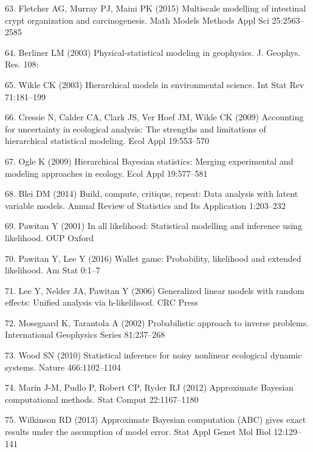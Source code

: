 \documentclass[10pt,letterpaper]{article}
\begin{document}
\hypertarget{ref-Fletcher2015-yc}{}
63. Fletcher AG, Murray PJ, Maini PK (2015) Multiscale modelling of
intestinal crypt organization and carcinogenesis. Math Models Methods
Appl Sci 25:2563--2585

\hypertarget{ref-Berliner2003-yl}{}
64. Berliner LM (2003) Physical-statistical modeling in geophysics. J.
Geophys. Res. 108:

\hypertarget{ref-Wikle2003-je}{}
65. Wikle CK (2003) Hierarchical models in environmental science. Int
Stat Rev 71:181--199

\hypertarget{ref-Cressie2009-wy}{}
66. Cressie N, Calder CA, Clark JS, Ver Hoef JM, Wikle CK (2009)
Accounting for uncertainty in ecological analysis: The strengths and
limitations of hierarchical statistical modeling. Ecol Appl 19:553--570

\hypertarget{ref-Ogle2009-cb}{}
67. Ogle K (2009) Hierarchical Bayesian statistics: Merging experimental
and modeling approaches in ecology. Ecol Appl 19:577--581

\hypertarget{ref-Blei2014-dh}{}
68. Blei DM (2014) Build, compute, critique, repeat: Data analysis with
latent variable models. Annual Review of Statistics and Its Application
1:203--232

\hypertarget{ref-Pawitan2001-xm}{}
69. Pawitan Y (2001) In all likelihood: Statistical modelling and
inference using likelihood. OUP Oxford

\hypertarget{ref-Pawitan2016-cz}{}
70. Pawitan Y, Lee Y (2016) Wallet game: Probability, likelihood and
extended likelihood. Am Stat 0:1--7

\hypertarget{ref-Lee2006-mr}{}
71. Lee Y, Nelder JA, Pawitan Y (2006) Generalized linear models with
random effects: Unified analysis via h-likelihood. CRC Press

\hypertarget{ref-Mosegaard2002-lx}{}
72. Mosegaard K, Tarantola A (2002) Probabilistic approach to inverse
problems. International Geophysics Series 81:237--268

\hypertarget{ref-Wood2010-hp}{}
73. Wood SN (2010) Statistical inference for noisy nonlinear ecological
dynamic systems. Nature 466:1102--1104

\hypertarget{ref-Marin2012-fd}{}
74. Marin J-M, Pudlo P, Robert CP, Ryder RJ (2012) Approximate Bayesian
computational methods. Stat Comput 22:1167--1180

\hypertarget{ref-Wilkinson2013-rs}{}
75. Wilkinson RD (2013) Approximate Bayesian computation (ABC) gives
exact results under the assumption of model error. Stat Appl Genet Mol
Biol 12:129--141
\end{document}
